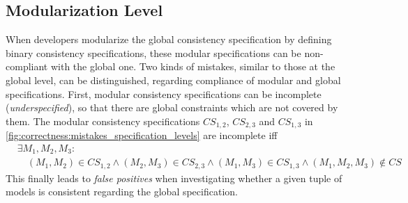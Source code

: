 \subsection{Modularization Level}
When developers modularize the global consistency specification by defining binary consistency specifications, these modular specifications can be non-compliant with the global one. 
Two kinds of mistakes, similar to those at the global level, can be distinguished, regarding compliance of modular and global specifications. %
First, modular consistency specifications can be incomplete (\emph{underspecified}), so that there are global constraints which are not covered by them. 
The modular consistency specifications $\mathit{CS}_{1,2}$, $\mathit{CS}_{2,3}$ and $\mathit{CS}_{1,3}$ in \autoref{fig:correctness:mistakes_specification_levels} are incomplete iff
\begin{align*}
    & \exists M_1, M_2, M_3 : \\
    & \hspace{1em} (M_1, M_2) \in \mathit{CS}_{1,2} \land (M_2, M_3) \in \mathit{CS}_{2,3} \land (M_1, M_3) \in \mathit{CS}_{1,3} \land (M_1, M_2, M_3) \not\in \mathit{CS}
\end{align*}
This finally leads to \emph{false positives} when investigating whether a given tuple of models is consistent regarding the global specification. %
